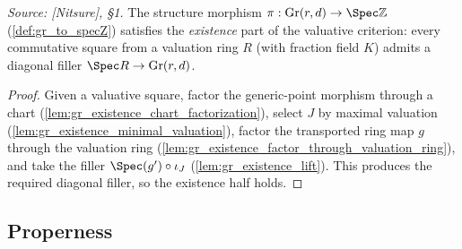 \begin{lemma}

  \label{lem:gr_valuativeExistence_toSpecZ}
  \textit{Source: [Nitsure], \S 1.}
  The structure morphism \(\pi : \mathrm{Gr}(r,d) \to \Spec \mathbb{Z}\)
  (\cref{def:gr_to_specZ}) satisfies the \emph{existence} part of the valuative
  criterion: every commutative square from a valuation ring \(R\) (with fraction
  field \(K\)) admits a diagonal filler \(\Spec R \to \mathrm{Gr}(r,d)\).
\end{lemma}
\begin{proof}
    \leanok
  Given a valuative square, factor the generic-point morphism through a chart
  (\cref{lem:gr_existence_chart_factorization}), select \(J\) by maximal valuation
  (\cref{lem:gr_existence_minimal_valuation}), factor the transported ring map
  \(g\) through the valuation ring (\cref{lem:gr_existence_factor_through_valuation_ring}),
  and take the filler \(\Spec(g') \circ \iota_J\)
  (\cref{lem:gr_existence_lift}). This produces the required diagonal filler, so the
  existence half holds.
\end{proof}

\subsection*{Properness}

